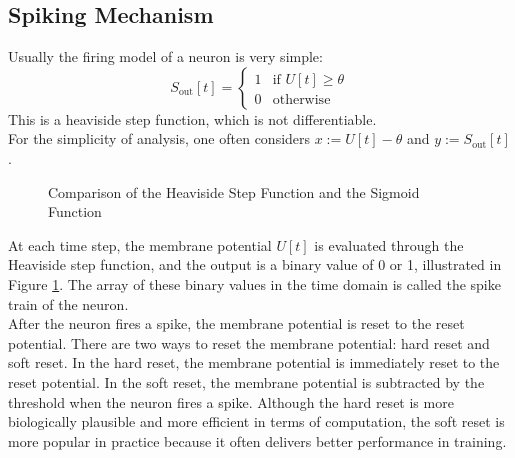     \subsection{Spiking Mechanism}
    \label{subsec:lif_spiking}
        Usually the firing model of a neuron is very simple: 
        \begin{equation}
            S_{\text{out}}[t] = \begin{cases}
                1 & \text{if } U[t] \geq \theta \\
                0 & \text{otherwise}
            \end{cases}
        \end{equation}
        This is a heaviside step function, which is not differentiable. \\
        For the simplicity of analysis, one often considers $x := U[t] - \theta$ and $y := S_{\text{out}}[t]$.
        \begin{figure}[!htpb]
            \centering
            \caption{Comparison of the Heaviside Step Function and the Sigmoid Function}
            \label{fig:heaviside_sigmoid}
        \end{figure}
        At each time step, the membrane potential $U[t]$ is evaluated through the Heaviside step function, and
        the output is a binary value of 0 or 1, illustrated in Figure \ref{fig:heaviside_sigmoid}. The array of these binary values in the time domain is called the
        spike train of the neuron. \\
        After the neuron fires a spike, the membrane potential is reset to the reset potential. There are two ways
        to reset the membrane potential: hard reset and soft reset. In the hard reset, the membrane potential is
        immediately reset to the reset potential. In the soft reset, the membrane potential is subtracted by the
        threshold when the neuron fires a spike. Although the hard reset is more biologically plausible and more 
        efficient in terms of computation, the soft reset is more popular in practice because it often delivers 
        better performance in training.

